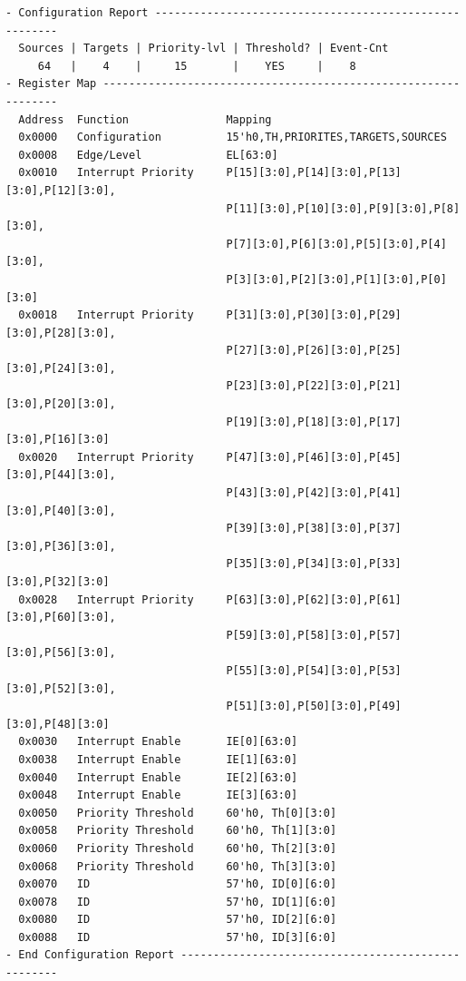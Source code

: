 \begin{verbatim}
- Configuration Report -------------------------------------------------------
  Sources | Targets | Priority-lvl | Threshold? | Event-Cnt  
     64   |    4    |     15       |    YES     |    8       
- Register Map ---------------------------------------------------------------
  Address  Function               Mapping
  0x0000   Configuration          15'h0,TH,PRIORITES,TARGETS,SOURCES
  0x0008   Edge/Level             EL[63:0]
  0x0010   Interrupt Priority     P[15][3:0],P[14][3:0],P[13][3:0],P[12][3:0],
                                  P[11][3:0],P[10][3:0],P[9][3:0],P[8][3:0],
                                  P[7][3:0],P[6][3:0],P[5][3:0],P[4][3:0],
                                  P[3][3:0],P[2][3:0],P[1][3:0],P[0][3:0]
  0x0018   Interrupt Priority     P[31][3:0],P[30][3:0],P[29][3:0],P[28][3:0],
                                  P[27][3:0],P[26][3:0],P[25][3:0],P[24][3:0],
                                  P[23][3:0],P[22][3:0],P[21][3:0],P[20][3:0],
                                  P[19][3:0],P[18][3:0],P[17][3:0],P[16][3:0]
  0x0020   Interrupt Priority     P[47][3:0],P[46][3:0],P[45][3:0],P[44][3:0],
                                  P[43][3:0],P[42][3:0],P[41][3:0],P[40][3:0],
                                  P[39][3:0],P[38][3:0],P[37][3:0],P[36][3:0],
                                  P[35][3:0],P[34][3:0],P[33][3:0],P[32][3:0]
  0x0028   Interrupt Priority     P[63][3:0],P[62][3:0],P[61][3:0],P[60][3:0],
                                  P[59][3:0],P[58][3:0],P[57][3:0],P[56][3:0],
                                  P[55][3:0],P[54][3:0],P[53][3:0],P[52][3:0],
                                  P[51][3:0],P[50][3:0],P[49][3:0],P[48][3:0]
  0x0030   Interrupt Enable       IE[0][63:0]
  0x0038   Interrupt Enable       IE[1][63:0]
  0x0040   Interrupt Enable       IE[2][63:0]
  0x0048   Interrupt Enable       IE[3][63:0]
  0x0050   Priority Threshold     60'h0, Th[0][3:0]
  0x0058   Priority Threshold     60'h0, Th[1][3:0]
  0x0060   Priority Threshold     60'h0, Th[2][3:0]
  0x0068   Priority Threshold     60'h0, Th[3][3:0]
  0x0070   ID                     57'h0, ID[0][6:0]
  0x0078   ID                     57'h0, ID[1][6:0]
  0x0080   ID                     57'h0, ID[2][6:0]
  0x0088   ID                     57'h0, ID[3][6:0]
- End Configuration Report ---------------------------------------------------
\end{verbatim}




